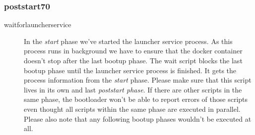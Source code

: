 			\subsubsection{poststart70}
			\begin{description}
				\item[waitforlauncherservice] In the \emph{start} phase we've started the launcher service process. As this process runs in background we have to ensure that the docker container doesn't stop after the last bootup phase. The wait script blocks the last bootup phase until the launcher service process is finished. It gets the process information from the \emph{start} phase. Please make sure that this script lives in its own and last \emph{poststart phase}. If there are other scripts in the same phase, the bootloader won't be able to report errors of those scripts even thought all scripts within the same phase are executed in parallel. Please also note that any following bootup phases wouldn't be executed at all.
			\end{description}
			